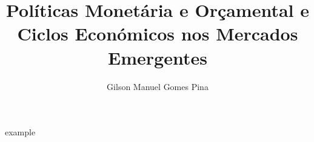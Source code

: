 \documentclass{beamer}
\title[Prova de Doutoramento em Economia | Coimbra, 15 de Abil de 2016]{\Large \bf Políticas Monetária e Orçamental e Ciclos Económicos nos Mercados Emergentes}
\author[Gilson Pina]{Gilson Manuel Gomes Pina}
\date{
{\begin{minipage}[c]{16cm}
\begin{flushleft}
\textbf{Orientadores:} \\ 
\small Professor Doutor Pedro Bação (FEUC)\\
\small Professor Doutor Ricardo M. Sousa (EEG/UM)
\end{flushleft}
 \end{minipage}}\\
\vspace*{0.5cm}
{Prova de Doutoramento em Economia}\\
{\small  Coimbra, 15 de Abril de 2016}
}
\begin{document}
\begin{frame}
  example
\end{frame}
\end{document}
